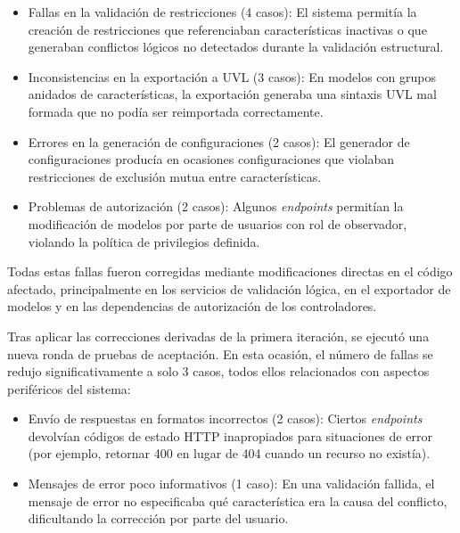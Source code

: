 \begin{itemize}
    \item Fallas en la validación de restricciones (4 casos): El sistema permitía la creación de restricciones que 
    referenciaban características inactivas o que generaban conflictos lógicos no detectados durante la validación estructural.

    \item Inconsistencias en la exportación a \ac{UVL} (3 casos): En modelos con grupos anidados de características, 
    la exportación generaba una sintaxis \ac{UVL} mal formada que no podía ser reimportada correctamente.

    \item Errores en la generación de configuraciones (2 casos): El generador de configuraciones producía en 
    ocasiones configuraciones que violaban restricciones de exclusión mutua entre características.

    \item Problemas de autorización (2 casos): Algunos \textit{endpoints} permitían la modificación 
    de modelos por parte de usuarios con rol de observador, violando la política de privilegios definida.
\end{itemize}

Todas estas fallas fueron corregidas mediante modificaciones directas en el código afectado, 
principalmente en los servicios de validación lógica, en el exportador de modelos y en las dependencias de 
autorización de los controladores.

Tras aplicar las correcciones derivadas de la primera iteración, se ejecutó una nueva ronda de pruebas de 
aceptación. En esta ocasión, el número de fallas se redujo significativamente a solo 3 casos, todos 
ellos relacionados con aspectos periféricos del sistema:

\begin{itemize}
    \item Envío de respuestas en formatos incorrectos (2 casos): Ciertos \textit{endpoints} devolvían códigos de estado 
    \ac{HTTP} inapropiados para situaciones de error (por ejemplo, retornar 400 en lugar de 404 cuando un recurso no existía).

    \item Mensajes de error poco informativos (1 caso): En una validación fallida, el mensaje de error no especificaba qué 
    característica era la causa del conflicto, dificultando la corrección por parte del usuario.
\end{itemize}

